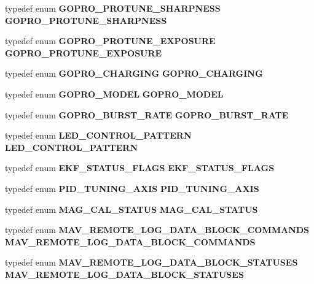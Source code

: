 \begin{DoxyCompactItemize}
\item 
typedef enum \textbf{ G\+O\+P\+R\+O\+\_\+\+P\+R\+O\+T\+U\+N\+E\+\_\+\+S\+H\+A\+R\+P\+N\+E\+SS} \textbf{ G\+O\+P\+R\+O\+\_\+\+P\+R\+O\+T\+U\+N\+E\+\_\+\+S\+H\+A\+R\+P\+N\+E\+SS}
\item 
typedef enum \textbf{ G\+O\+P\+R\+O\+\_\+\+P\+R\+O\+T\+U\+N\+E\+\_\+\+E\+X\+P\+O\+S\+U\+RE} \textbf{ G\+O\+P\+R\+O\+\_\+\+P\+R\+O\+T\+U\+N\+E\+\_\+\+E\+X\+P\+O\+S\+U\+RE}
\item 
typedef enum \textbf{ G\+O\+P\+R\+O\+\_\+\+C\+H\+A\+R\+G\+I\+NG} \textbf{ G\+O\+P\+R\+O\+\_\+\+C\+H\+A\+R\+G\+I\+NG}
\item 
typedef enum \textbf{ G\+O\+P\+R\+O\+\_\+\+M\+O\+D\+EL} \textbf{ G\+O\+P\+R\+O\+\_\+\+M\+O\+D\+EL}
\item 
typedef enum \textbf{ G\+O\+P\+R\+O\+\_\+\+B\+U\+R\+S\+T\+\_\+\+R\+A\+TE} \textbf{ G\+O\+P\+R\+O\+\_\+\+B\+U\+R\+S\+T\+\_\+\+R\+A\+TE}
\item 
typedef enum \textbf{ L\+E\+D\+\_\+\+C\+O\+N\+T\+R\+O\+L\+\_\+\+P\+A\+T\+T\+E\+RN} \textbf{ L\+E\+D\+\_\+\+C\+O\+N\+T\+R\+O\+L\+\_\+\+P\+A\+T\+T\+E\+RN}
\item 
typedef enum \textbf{ E\+K\+F\+\_\+\+S\+T\+A\+T\+U\+S\+\_\+\+F\+L\+A\+GS} \textbf{ E\+K\+F\+\_\+\+S\+T\+A\+T\+U\+S\+\_\+\+F\+L\+A\+GS}
\item 
typedef enum \textbf{ P\+I\+D\+\_\+\+T\+U\+N\+I\+N\+G\+\_\+\+A\+X\+IS} \textbf{ P\+I\+D\+\_\+\+T\+U\+N\+I\+N\+G\+\_\+\+A\+X\+IS}
\item 
typedef enum \textbf{ M\+A\+G\+\_\+\+C\+A\+L\+\_\+\+S\+T\+A\+T\+US} \textbf{ M\+A\+G\+\_\+\+C\+A\+L\+\_\+\+S\+T\+A\+T\+US}
\item 
typedef enum \textbf{ M\+A\+V\+\_\+\+R\+E\+M\+O\+T\+E\+\_\+\+L\+O\+G\+\_\+\+D\+A\+T\+A\+\_\+\+B\+L\+O\+C\+K\+\_\+\+C\+O\+M\+M\+A\+N\+DS} \textbf{ M\+A\+V\+\_\+\+R\+E\+M\+O\+T\+E\+\_\+\+L\+O\+G\+\_\+\+D\+A\+T\+A\+\_\+\+B\+L\+O\+C\+K\+\_\+\+C\+O\+M\+M\+A\+N\+DS}
\item 
typedef enum \textbf{ M\+A\+V\+\_\+\+R\+E\+M\+O\+T\+E\+\_\+\+L\+O\+G\+\_\+\+D\+A\+T\+A\+\_\+\+B\+L\+O\+C\+K\+\_\+\+S\+T\+A\+T\+U\+S\+ES} \textbf{ M\+A\+V\+\_\+\+R\+E\+M\+O\+T\+E\+\_\+\+L\+O\+G\+\_\+\+D\+A\+T\+A\+\_\+\+B\+L\+O\+C\+K\+\_\+\+S\+T\+A\+T\+U\+S\+ES}
\end{DoxyCompactItemize}

